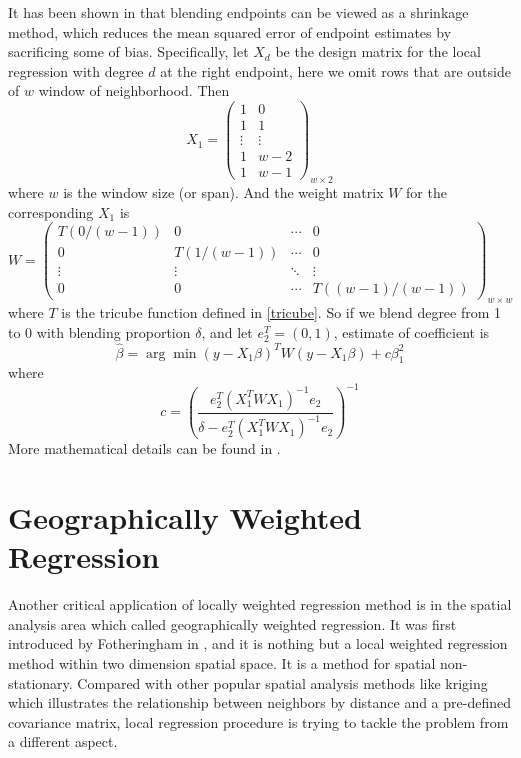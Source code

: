 It has been shown in \cite{hafen2010local} that blending endpoints can be viewed
as a shrinkage method, which reduces the mean squared error of endpoint estimates
by sacrificing some of bias. Specifically, let $X_d$ be the design matrix for the
local regression with degree $d$ at the right endpoint, here we omit rows that
are outside of $w$ window of neighborhood. Then
\begin{equation}
X_1 =  
\begin{pmatrix}
  1 & 0  \\
  1 & 1  \\
  \vdots &  \vdots  \\
  1 & w-2 \\
  1 & w-1 
\end{pmatrix}
_{w \times 2}
\end{equation}
where $w$ is the window size (or span). And the weight matrix $W$ for the 
corresponding $X_1$ is
\begin{equation}
W =  
\begin{pmatrix}
  T(0/(w-1)) & 0 & \cdots & 0 \\
  0 & T(1/(w-1)) & \cdots & 0 \\
  \vdots  & \vdots & \ddots & \vdots  \\
  0 & 0 & \cdots & T((w-1)/(w-1)) 
\end{pmatrix}
_{w \times w}
\end{equation}
where $T$ is the tricube function defined in \ref{tricube}. So if we blend degree
from 1 to 0 with blending proportion $\delta$, and let $e_2^T = (0,1)$, estimate 
of coefficient is
\begin{equation}
\hat \beta = \arg \min (y- X_1\beta)^TW(y - X_1\beta) + c\beta_1^2
\end{equation}
where 
\begin{equation}
c = \left(\frac{e_2^T(X_1^TWX_1)^{-1}e_2}{\delta - e_2^T(X_1^TWX_1)^{-1}e_2}\right)^{-1}
\end{equation}
More mathematical details can be found in \cite{hafen2010local}.

\section{Geographically Weighted Regression}

Another critical application of locally weighted regression method is in the 
spatial analysis area which called geographically weighted regression. It was first
introduced by Fotheringham in \cite{fotheringhamgeographically}, and it is nothing
but a local weighted regression method within two dimension spatial space. It is
a method for spatial non-stationary. Compared with other popular spatial analysis
methods like kriging \cite{krige1951statistical} which illustrates the relationship 
between neighbors by distance and a pre-defined covariance matrix, local regression 
procedure is trying to tackle the problem from a different aspect.

